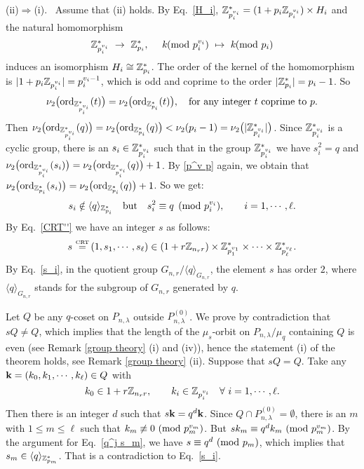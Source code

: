 \documentclass{article}
\numberwithin{equation}{section}
\numberwithin{table}{section}
\def\Z{{\Bbb Z}}
\def\CRT{\,\mathop{=}\limits^{\mbox{\rm\tiny CRT}}\,}
\begin{document}
(ii)$\Rightarrow$(i).~
Assume that (ii) holds. By Eq.~\eqref{H_i},
$\Z_{p_i^{v_i}}^*=(1+p_i\Z_{p_i^{v_i}})\times H_i$ and
the natural homomorphism
\begin{equation*}%
\Z_{p_i^{v_i}}^*~\to~\Z_{p_i}^*,~~~~ 
  k\!\!\!\pmod{p_i^{v_i}}~\mapsto~ k\!\!\!\pmod{p_i}
\end{equation*} 
induces an isomorphism $H_i\cong\Z_{p_i}^*$.
The order of the kernel of the homomorphism is
$|1+p_i\Z_{p_i^{v_i}}|=p_i^{v_i-1}$, 
which is odd and coprime to the order $|\Z_{p_i}^*|=p_i-1$. So
\begin{equation}\label{p^v p}
 \nu_2\big({\rm ord}_{\Z_{p_i^{v_i}}^*}(t)\big)=
 \nu_2\big({\rm ord}_{\Z_{p_i}^*}(t)\big),~~~\mbox{for any integer $t$ coprime to $p$.}
\end{equation}
Then $\nu_2\big({\rm ord}_{\Z_{p_i^{v_i}}^*}(q)\big)=
 \nu_2\big({\rm ord}_{\Z_{p_i}^*}(q)\big)<\nu_2(p_i-1)
 =\nu_2\big(|\Z_{p_i^{v_i}}^*|\big)$.
Since $\Z_{p_i^{v_i}}^*$ is a cyclic group,
there is an $s_i\in\Z_{p_i^{v_i}}^*$ such that 
in the group $\Z_{p_i^{v_i}}^*$ we have
$s_i^2 = q$ and
$\nu_2\big({\rm ord}_{\Z_{p_i^{v_i}}^*}(s_i)\big)=
 \nu_2\big({\rm ord}_{\Z_{p_i^{v_i}}^*}(q)\big)+1$.
By \eqref{p^v p} again, we obtain that
$\nu_2\big({\rm ord}_{\Z_{p_i}^*}(s_i)\big)=
 \nu_2\big({\rm ord}_{\Z_{p_i}^*}(q)\big)+1$.
So we get:
\begin{equation}\label{s_i}
 s_i\notin\langle q\rangle_{\Z_{p_i}^*}
  \quad\mbox{but}\quad
 s_i^2 \equiv q\pmod{p_i^{v_i}},\qquad i=1,\cdots,\ell.
\end{equation}
By Eq.~\eqref{CRT''} we have an integer $s$ as follows:
$$
 s\CRT (1,s_1,\cdots,s_\ell)\in (1+r\Z_{n_r r})
 \times \Z_{p_1^{v_1}}^*\times\cdots\times\Z_{p_\ell^{v_\ell}}^*.
$$
By Eq.~\eqref{s_i},
in the quotient group $G_{n,r}/\langle q\rangle_{G_{n,r}}$, the element
$s$ has order $2$, where $\langle q\rangle_{G_{n,r}}$ stands for the subgroup
of $G_{n,r}$ generated by $q$.

Let $Q$ be any $q$-coset on $P_{n,\lambda}$ outside $P_{n,\lambda}^{(0)}$.
We prove by contradiction that $sQ\ne Q$,
which implies that the length of
the $\mu_s$-orbit on $P_{n,\lambda}/\mu_q$ containing $Q$ is even
(see Remark \ref{group theory} (i) and (iv)),
hence the statement (i) of the theorem holds, see Remark \ref{group theory} (ii).
Suppose that $sQ=Q$. Take any
${\bf k}=(k_0,k_1,\cdots,k_\ell)\in Q$ with
$$k_0\in 1+r\Z_{n_r r}, \qquad
 k_i\in\Z_{p_i^{v_i}}\quad\forall~ i=1,\cdots,\ell.
$$
Then there is an integer $d$ such that $s{\bf k}=q^d{\bf k}$.
Since $Q\cap P_{n,\lambda}^{(0)}=\emptyset$,
there is an $m$ with $1\le m\le \ell$ such that
$k_m\not\equiv 0~({\rm mod}~p_m^{v_m})$.
But $sk_m\equiv q^d k_m~({\rm mod}~p_m^{v_m})$.
By the argument for Eq.~\eqref{q^j s_m}, 
we have $s\equiv q^d~({\rm mod}~p_m)$,
which implies that $s_m\in\langle q\rangle_{\Z_{p_m}^*}$.
That is a contradiction to Eq.~\eqref{s_i}.
\end{document}
